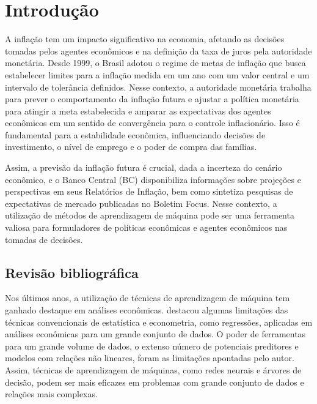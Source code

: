 
\chapter[Introdução]{Introdução}

A inflação tem um impacto significativo na economia, afetando as decisões tomadas pelos agentes econômicos e na definição da taxa de juros pela autoridade monetária. Desde 1999, o Brasil adotou o regime de metas de inflação que busca estabelecer limites para a inflação medida em um ano com um valor central e um intervalo de tolerância definidos. Nesse contexto, a autoridade monetária trabalha para prever o comportamento da inflação futura e ajustar a política monetária para atingir a meta estabelecida e amparar as expectativas dos agentes econômicos em um sentido de convergência para o controle inflacionário. Isso é fundamental para a estabilidade econômica, influenciando decisões de investimento, o nível de emprego e o poder de compra das famílias.

Assim, a previsão da inflação futura é crucial, dada a incerteza do cenário econômico, e o Banco Central (BC) disponibiliza informações sobre projeções e  perspectivas em seus Relatórios de Inflação, bem como sintetiza pesquisas de expectativas de mercado publicadas no Boletim Focus. Nesse contexto, a utilização de métodos de aprendizagem de máquina pode ser uma ferramenta valiosa para formuladores de políticas econômicas e agentes econômicos nas tomadas de decisões.

\section{Revisão bibliográfica}\label{sec-revisao-bibliografica}

Nos últimos anos, a utilização de técnicas de aprendizagem de máquina tem ganhado destaque em análises econômicas.  destacou algumas limitações das técnicas convencionais de estatística e econometria, como regressões, aplicadas em análises econômicas para um grande conjunto de dados. O poder de ferramentas para um grande volume de dados, o extenso número de potenciais preditores e modelos com relações não lineares, foram as limitações apontadas pelo autor. Assim, técnicas de aprendizagem de máquinas, como redes neurais e árvores de decisão, podem ser mais eficazes em problemas com grande conjunto de dados e relações mais complexas.

